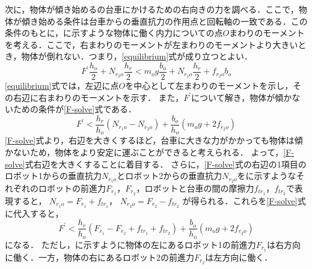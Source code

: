 次に，物体が傾き始めるの台車にかけるための右向きの力を調べる．ここで，物体が傾き始める条件は台車からの垂直抗力の作用点と回転軸の一致である．この条件のもとに，に示すような物体に働く内力についての点$O$まわりのモーメントを考える．ここで，右まわりのモーメントが左まわりのモーメントより大きいとき，物体が倒れない．つまり，\eqref{equilibrium}式が成り立つとよい．
\begin{equation}
F^{\prime} \frac{h_{o}}{2}+N_{r_{2} o} \frac{h_{r}}{2}<m_{o} g \frac{b_{o}}{2}+N_{r_{1} o} \frac{h_{r}}{2}+f_{r_{2} o} b_{o}
\label{equilibrium}
\end{equation}
\eqref{equilibrium}式では，左辺に点$O$を中心として左まわりのモーメントを示し，その右辺に右まわりのモーメントを示す．
また，$F^{\prime}$について解き，物体が傾かないための条件が\eqref{F-solve}式である．
\begin{equation}
    F^{\prime}<\frac{h_{r}}{h_{o}}\left(N_{r_{1} o}-N_{r_{2} o}\right)+\frac{b_{o}}{h_{o}}\left(m_{o} g+2 f_{r_2 o}\right)
    \label{F-solve}
\end{equation}
\eqref{F-solve}式より，右辺を大きくするほど，台車に大きな力がかかっても物体は傾かないため，物体をより安定に運ぶことができると考えられる．
よって，\eqref{F-solve}式右辺を大きくすることに着目する．
さらに，\eqref{F-solve}式の右辺の1項目のロボット1からの垂直抗力$N_{r_1 o}$とロボット2からの垂直抗力$N_{r_2 o}$をに示すようなそれぞれのロボットの前進力$F_{r_1}$，$F_{r_2}$，ロボットと台車の間の摩擦力$f_{tr_1}$，$f_{tr_2}$で表現すると，
$N_{r_{1} o}=F_{r_{1}}+f_{t{r_1}}$，
$N_{r_{2} o}=F_{r_{2}}-f_{t{r_2}}$
が得られる．これらを\eqref{F-solve}式に代入すると，
\begin{equation}
    F^{\prime}<\frac{h_{r}}{h_{o}}\left(F_{r_{1}}-F_{r_{2}}+f_{t{r_1}}+f_{t{r_2}}\right)+\frac{b_{o}}{h_{o}}\left(m_{o} g+2 f_{r_2 o}\right)
    \label{F-solve-again}
\end{equation}
になる．
ただし，に示すように物体の左にあるロボット1の前進力$F_{r_{1}}$は右方向に働く．一方，物体の右にあるロボット2の前進力$F_{r_{2}}$は左方向に働く．

